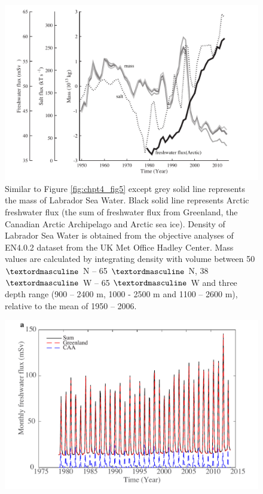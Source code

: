\begin{figure}
	\centering
	\includegraphics{figs_app/FigS8.pdf}
	\caption[Similar to Figure \ref{fig:chpt4_fig5} except grey solid line represents the mass of Labrador Sea Water.]{Similar to Figure \ref{fig:chpt4_fig5} except grey solid line represents the mass of Labrador Sea Water.  Black solid line represents Arctic freshwater flux (the sum of freshwater flux from Greenland, the Canadian Arctic Archipelago and Arctic sea ice). Density of Labrador Sea Water is obtained from the objective analyses of EN4.0.2 dataset from the UK Met Office Hadley Center\cite[]{good2013en4}.  Mass values are calculated by integrating density with volume between 50 $\textordmasculine$ N – 65 $\textordmasculine$ N, 38 $\textordmasculine$ W – 65 $\textordmasculine$ W and three depth range (900 – 2400 m, 1000 - 2500 m and 1100 – 2600 m), relative to the mean of 1950 – 2006. }
	\label{fig:SI4_fig8}
\end{figure}

\begin{figure}
	\centering
	\includegraphics{figs_app/FigS9a.pdf}
\end{figure}

